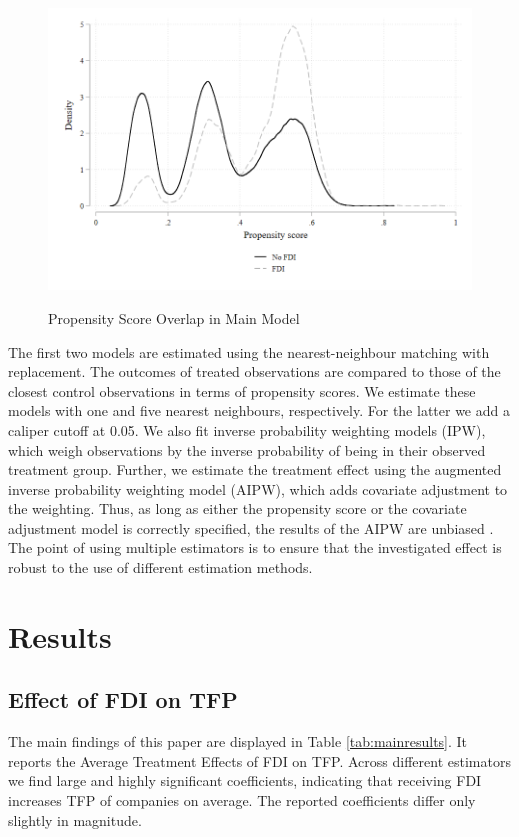 \documentclass[a4paper,11pt]{scrartcl}
\begin{document}
\begin{figure}[h!]
	\centering
	\caption{Propensity Score Overlap in Main Model}
	\includegraphics[width=\textwidth]{graph}
  	\label{fig:graph}
\end{figure} 
\FloatBarrier

\newpage

The first two models are estimated using the nearest-neighbour matching with replacement. The outcomes of treated observations are compared to those of the closest control observations in terms of propensity scores. We estimate these models with one and five nearest neighbours, respectively. For the latter we add a caliper cutoff at 0.05. We also fit inverse probability weighting models (IPW), which weigh observations by the inverse probability of being in their observed treatment group. Further, we estimate the treatment effect using the augmented inverse probability weighting model (AIPW), which adds covariate adjustment to the weighting. Thus, as long as either the propensity score or the covariate adjustment model is correctly specified, the results of the AIPW are unbiased \citep[p.~393]{imbens2015}. The point of using multiple estimators is to ensure that the investigated effect is robust to the use of different estimation methods.

\section{Results}

\subsection{Effect of FDI on TFP}
The main findings of this paper are displayed in Table \ref{tab:mainresults}. It reports the Average Treatment Effects of FDI on TFP. Across different estimators we find large and highly significant coefficients, indicating that receiving FDI increases TFP of companies on average. The reported coefficients differ only slightly in magnitude. 
\end{document}
